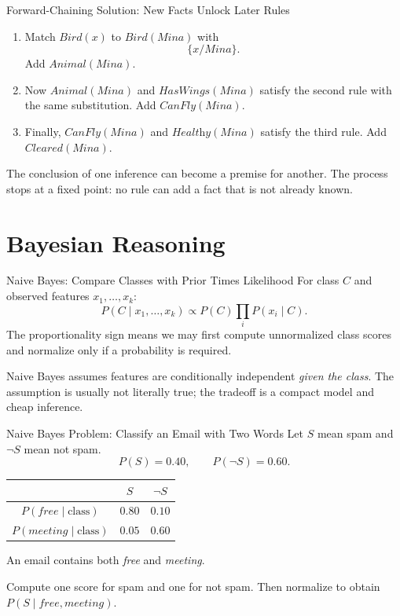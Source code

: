 \documentclass[aspectratio=169,10pt]{beamer}
\begin{document}
\begin{frame}{Forward-Chaining Solution: New Facts Unlock Later Rules}
  \small
  \begin{enumerate}
    \item Match $\textit{Bird}(x)$ to $\textit{Bird}(\textit{Mina})$ with
    \[
      \{x/\textit{Mina}\}.
    \]
    Add $\textit{Animal}(\textit{Mina})$.
    \item Now $\textit{Animal}(\textit{Mina})$ and $\textit{HasWings}(\textit{Mina})$ satisfy the second rule with the same substitution. Add $\textit{CanFly}(\textit{Mina})$.
    \item Finally, $\textit{CanFly}(\textit{Mina})$ and $\textit{Healthy}(\textit{Mina})$ satisfy the third rule. Add $\textit{Cleared}(\textit{Mina})$.
  \end{enumerate}
  \begin{keyidea}
    The conclusion of one inference can become a premise for another. The process stops at a fixed point: no rule can add a fact that is not already known.
  \end{keyidea}
\end{frame}

\section{Bayesian Reasoning}

\begin{frame}{Naive Bayes: Compare Classes with Prior Times Likelihood}
  For class $C$ and observed features $x_1,\ldots,x_k$:
  \[
    P(C\mid x_1,\ldots,x_k)
    \propto P(C)\prod_i P(x_i\mid C).
  \]
  The proportionality sign means we may first compute unnormalized class scores and normalize only if a probability is required.
  \begin{keyidea}
    Naive Bayes assumes features are conditionally independent \emph{given the class}. The assumption is usually not literally true; the tradeoff is a compact model and cheap inference.
  \end{keyidea}
\end{frame}

\begin{frame}{Naive Bayes Problem: Classify an Email with Two Words}
  Let $S$ mean spam and $\neg S$ mean not spam.
  \[
  P(S)=0.40,\qquad P(\neg S)=0.60.
  \]
  \begin{center}
    \renewcommand{\arraystretch}{1.45}
    \begin{tabular}{c|cc}
      & $S$ & $\neg S$\\\hline
      $P(\textit{free}\mid\text{class})$ & $0.80$ & $0.10$\\
      $P(\textit{meeting}\mid\text{class})$ & $0.05$ & $0.60$
    \end{tabular}
  \end{center}
  An email contains both \textit{free} and \textit{meeting}.
  \begin{activity}
    Compute one score for spam and one for not spam. Then normalize to obtain $P(S\mid \textit{free},\textit{meeting})$.
  \end{activity}
\end{frame}
\end{document}

